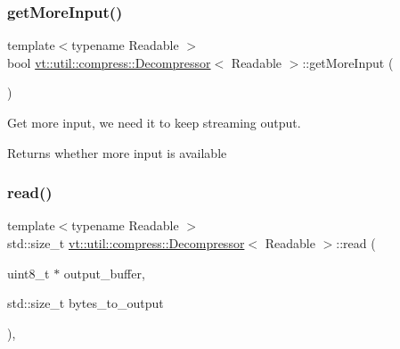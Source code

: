 \mbox{\label{structvt_1_1util_1_1compress_1_1_decompressor_ac3dbfbc0bf26e58037008071ad4ebb63}} 
\subsubsection{\texorpdfstring{get\+More\+Input()}{getMoreInput()}}
{\footnotesize\ttfamily template$<$typename Readable $>$ \\
bool \hyperlink{structvt_1_1util_1_1compress_1_1_decompressor}{vt\+::util\+::compress\+::\+Decompressor}$<$ Readable $>$\+::get\+More\+Input (\begin{DoxyParamCaption}{ }\end{DoxyParamCaption})\hspace{0.3cm}{\ttfamily [protected]}}



Get more input, we need it to keep streaming output. 

\begin{DoxyReturn}{Returns}
whether more input is available 
\end{DoxyReturn}
\mbox{\label{structvt_1_1util_1_1compress_1_1_decompressor_a75d6946b3e1526fcf0cc6931f5e61774}} 
\subsubsection{\texorpdfstring{read()}{read()}}
{\footnotesize\ttfamily template$<$typename Readable $>$ \\
std\+::size\+\_\+t \hyperlink{structvt_1_1util_1_1compress_1_1_decompressor}{vt\+::util\+::compress\+::\+Decompressor}$<$ Readable $>$\+::read (\begin{DoxyParamCaption}\item[{uint8\+\_\+t $\ast$}]{output\+\_\+buffer,  }\item[{std\+::size\+\_\+t}]{bytes\+\_\+to\+\_\+output }\end{DoxyParamCaption})\hspace{0.3cm}{\ttfamily [override]}, {\ttfamily [virtual]}}



